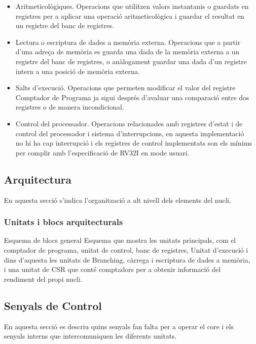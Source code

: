\documentclass[10pt,a4paper,twocolumn,twoside]{article}
\begin{document}
        \begin{itemize}
            \item Aritmeticològiques. Operacions que utilitzen valors instantanis o guardats en registres per a aplicar una operació aritmeticològica i guardar el resultat en un registre del banc de registres.
            \item Lectura o escriptura de dades a memòria externa. Operacions que a partir d'una adreça de memòria es guarda una dada de la memòria externa a un registre del banc de registres, o anàlogament guardar una dada d'un registre intern a una posició de memòria externa.
            \item Salts d'execució. Operacions que permeten modificar el valor del registre Comptador de Programa ja sigui després d'avaluar una comparació entre dos registres o de manera incondicional.
            \item Control del processador. Operacions relacionades amb registres d'estat i de control del processador i sistema d'interrupcions, en aquesta implementació no hi ha cap interrupció i els registres de control implementats son els mínims per complir amb l'especificació de RV32I en mode usuari.
        \end{itemize}
        
        
        
    
        
        
        
    \subsection{Arquitectura}
    En aquesta secció s'indica l'organització a alt nivell dels elements del nucli.
        \subsubsection{Unitats i blocs arquitecturals}
        Esquema de blocs general
        Esquema que mostra les unitats principals, com el comptador de programa, unitat de control, banc de registres, Unitat d'execució i dins d'aquesta les unitats de Branching, càrrega i escriptura de dades a memòria, i una unitat de CSR que conté comptadors per a obtenir informació del rendiment del propi nucli.
    \subsection{Senyals de Control}
    En aquesta secció es descriu quins senyals fan falta per a operar el core i els senyals interns que intercomuniquen les diferents unitats.
\end{document}
